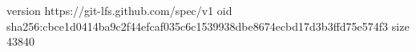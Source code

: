 version https://git-lfs.github.com/spec/v1
oid sha256:cbce1d0414ba9c2f44efcaf035c6c1539938dbe8674ecbd17d3b3ffd75e574f3
size 43840
